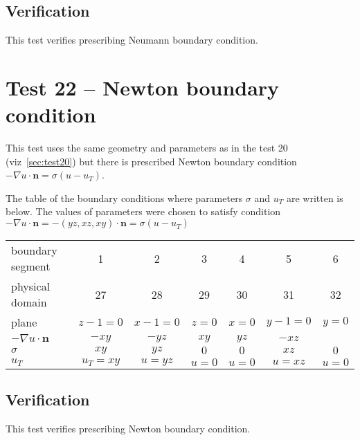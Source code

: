 \subsection*{Verification}
This test verifies prescribing Neumann boundary condition.

\section{Test 22 -- Newton boundary condition}
\label{sec:test21}
This test uses the same geometry and parameters as in the test 20 (viz~\ref{sec:test20}) but there is prescribed Newton boundary condition $-\nabla{}u\cdot{}\mathbf{n} = \sigma(u-u_T)$.

The table of the boundary conditions where parameters $\sigma$ and $u_T$ are written is below. The values of parameters were chosen to satisfy condition $-\nabla{}u\cdot{}\mathbf{n} = -(yz,xz,xy)\cdot\mathbf{n} = \sigma(u-u_T)$

\begin{center}
  \begin{tabular}{|l|c|c|c|c|c|c|}
      \hline
      boundary segment & 1 & 2 & 3 & 4 & 5 & 6 \\ 
      physical domain & 27 & 28 & 29 & 30 & 31 & 32 \\ 
      plane & $z-1=0$  & $x-1=0$ & $z=0$ & $x=0$ & $y-1=0$& $y=0$\\
      $-\nabla{}u\cdot{}\mathbf{n}$ & $-xy$ & $-yz$ & $xy$ & $yz$ & $-xz$ &\\
      $\sigma$ & $xy$ & $yz$ & $0$ & $0$ & $xz$ & $0$\\
      $u_T$ & $u_T=xy$ & $u=yz$ & $u=0$ & $u=0$ & $u=xz$ & $u=0$\\
      \hline
  \end{tabular}
\end{center}

\subsection*{Verification}
This test verifies prescribing Newton boundary condition.

